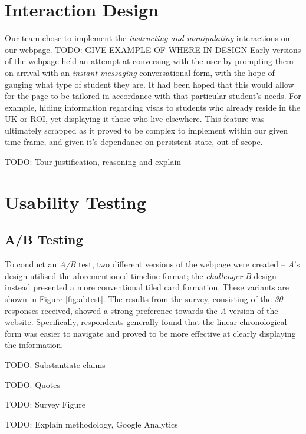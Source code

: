 \documentclass[a4paper, notoc]{tufte-handout}
\begin{document}
\section{Interaction Design}\label{label:interaction-design}

Our team chose to implement the \textit{instructing and manipulating} interactions on our webpage. TODO: GIVE EXAMPLE OF WHERE IN DESIGN Early versions of the webpage held an attempt at conversing with the user by prompting them on arrival with an \textit{instant messaging} conversational form, with the hope of gauging what type of student they are. It had been hoped that this would allow for the page to be tailored in accordance with that particular student's needs. For example, hiding information regarding visas to students who already reside in the UK or ROI, yet displaying it those who live elsewhere. This feature was ultimately scrapped as it proved to be complex to implement within our given time frame, and given it's dependance on persistent state, out of scope.

TODO: Tour justification, reasoning and explain



\section{Usability Testing}\label{sec:usability-testing}

\subsection{A/B Testing}\label{subsec:a-b-testing}

To conduct an \textit{A/B} test, two different versions of the webpage were created -- \textit{A}'s design utilised the aforementioned timeline format; the \textit{challenger} \textit{B} design instead presented a more conventional tiled card formation. These variants are shown in Figure \ref{fig:abtest}. The results from the survey, consisting of the \emph{30} responses received, showed a strong preference towards the \textit{A} version of the website. Specifically, respondents generally found that the linear chronological form was easier to navigate and proved to be more effective at clearly displaying the information.

TODO: Substantiate claims

TODO: Quotes

TODO: Survey Figure

TODO: Explain methodology, Google Analytics
\end{document}
